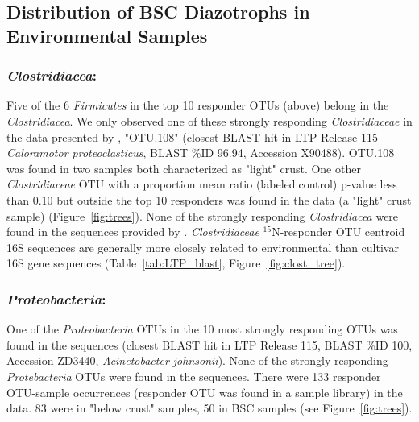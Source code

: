 \subsection{Distribution of BSC Diazotrophs in Environmental Samples}
\subsubsection{\textbf{\textit{Clostridiacea}:}} Five of the 6
\textit{Firmicutes} in the top 10 responder OTUs (above) belong in the
\textit{Clostridiacea}. We only observed one of these strongly
responding \textit{Clostridiaceae} in the data presented by
\citet{Garcia_Pichel_2013}, "OTU.108" (closest BLAST hit in LTP Release
115 -- \textit{Caloramotor proteoclasticus}, BLAST \%ID 96.94,
Accession X90488).  OTU.108 was found in two samples both characterized
as "light" crust. One other \textit{Clostridiaceae} OTU with a
proportion mean ratio (labeled:control) p-value less than 0.10 but
outside the top 10 responders was found in the
\citet{Garcia_Pichel_2013} data (a "light" crust sample)
(Figure~\ref{fig:trees}).  None of the strongly responding
\textit{Clostridiacea} were found in the sequences provided by
\citet{Steven_2013}. \textit{Clostridiaceae} $^{15}$N-responder OTU
centroid 16S sequences are generally more closely related to
environmental than cultivar 16S gene sequences
(Table~\ref{tab:LTP_blast}, Figure~\ref{fig:clost_tree}).   

\subsubsection{\textbf{\textit{Proteobacteria}:}} One of the
\textit{Proteobacteria} OTUs in the 10 most strongly responding OTUs was
found in the \citet{Garcia_Pichel_2013} sequences (closest
BLAST hit in LTP Release 115, BLAST \%ID 100, Accession ZD3440,
\textit{Acinetobacter johnsonii}). None of the strongly responding
\textit{Protebacteria} OTUs were found in the \citet{Steven_2013} sequences.
There were 133 responder OTU-sample occurrences (responder OTU was found in a
sample library) in the \citet{Steven_2013} data.  83 were in "below crust"
samples, 50 in BSC samples (see Figure~\ref{fig:trees}).

